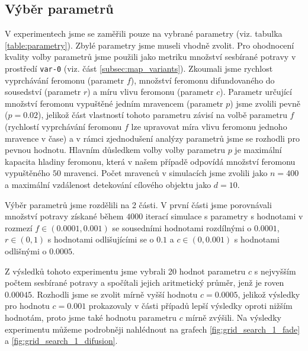 \documentclass[10pt,a4paper,twocolumn]{article}
\begin{document}
\subsection{Výběr parametrů}
\label{subsec:parameter_choice}
V experimentech jsme se zaměřili pouze na vybrané parametry 
(viz. tabulka \ref{table:parametry}). Zbylé
parametry jsme museli vhodně zvolit. Pro ohodnocení kvality volby
parametrů jsme použili jako metriku množství sesbírané potravy v 
prostředí \texttt{var-0} (viz. část \ref{subsec:map_variants}). 
Zkoumali jsme rychlost vyprchávání feromonu (parametr $f$), 
množství feromonu difundovaného do 
sousedství (parametr $r$) a míru vlivu feromonu (parametr $c$). Parametr
určující množství feromonu vypuštěné jedním mravencem (parametr $p$) jsme
zvolili pevně ($p = 0.02$), jelikož část vlastností tohoto parametru závisí
na volbě parametru $f$ (rychlostí vyprchávání feromonu $f$ lze upravovat
míra vlivu feromonu jednoho mravence v čase) a v rámci zjednodušení analýzy
parametrů jsme se rozhodli pro pevnou hodnotu. Hlavním důsledkem volby 
volby parametru $p$ je maximální kapacita hladiny feromonu, která v našem 
případě odpovídá množství feromonu vypuštěného $50$ mravenci. Počet 
mravenců v simulacích jsme zvolili jako $n = 400$ a maximální vzdálenost 
detekování cílového objektu jako $d = 10$. 

Výběr parametrů jsme rozdělili na 2 části. V první části jsme porovnávali
množství potravy získané během $4000$ iterací simulace s parametry s 
hodnotami v rozmezí $f \in (0.0001, 0.001)$ se sousedními hodnotami rozdílnými
o $0.0001$, $r \in (0, 1)$ s hodnotami odlišujícími se o $0.1$ a 
$c \in (0, 0.001)$ s hodnotami odlišnými o $0.0005$.

Z výsledků tohoto experimentu jsme vybrali 20 
hodnot parametru $c$ s nejvyšším počtem sesbírané potravy a spočítali 
jejich aritmetický průměr, jenž je roven $0.00045$. Rozhodli jsme se 
zvolit mírně vyšší hodnotu $c = 0.0005$, jelikož výsledky pro hodnotu 
$c=0.001$ prokazovaly v části případů lepší výsledky oproti nižším hodnotám, 
proto jsme také hodnotu parametru $c$ mírně zvýšili. Na výsledky experimentu
můžeme podrobněji nahlédnout na grafech \ref{fig:grid_search_1_fade} a 
\ref{fig:grid_search_1_difusion}.
\end{document}
